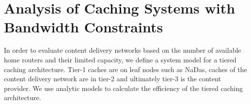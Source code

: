 \section{Analysis of Caching Systems with Bandwidth Constraints}\label{sec:hierarchical:analyticbw:model}

In order to evaluate content delivery networks based on the number of available home routers and their limited capacity, we define a system model for a tiered caching architecture.
Tier-1 caches are on leaf nodes such as NaDas, caches of the content delivery network are in tier-2 and ultimately tier-3 is the content provider.
We use analytic models to calculate the efficiency of the tiered caching architecture.





